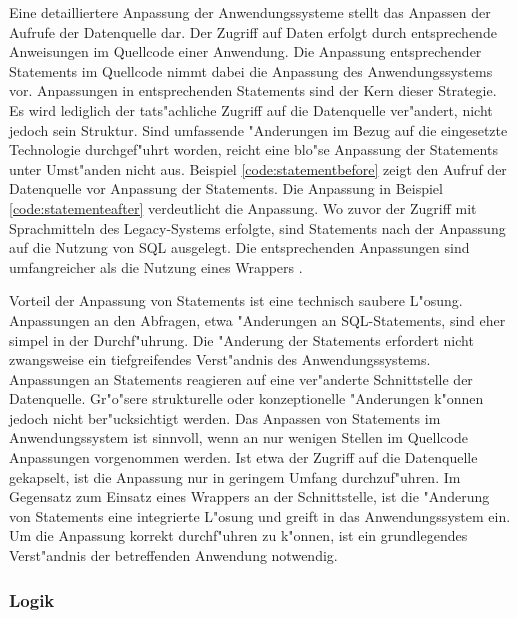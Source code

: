 Eine detailliertere Anpassung der Anwendungssysteme stellt das Anpassen der Aufrufe der Datenquelle dar. Der Zugriff auf Daten erfolgt durch entsprechende Anweisungen im Quellcode einer Anwendung. Die Anpassung entsprechender Statements im Quellcode nimmt dabei die Anpassung des Anwendungssystems vor. Anpassungen in entsprechenden Statements sind der Kern dieser Strategie. Es wird lediglich der tats"achliche Zugriff auf die Datenquelle ver"andert, nicht jedoch sein Struktur. Sind umfassende "Anderungen im Bezug auf die eingesetzte Technologie durchgef"uhrt worden, reicht eine blo"se Anpassung der Statements unter Umst"anden nicht aus.
\lb
Beispiel \ref{code:statementbefore} zeigt den Aufruf der Datenquelle vor Anpassung der Statements. Die Anpassung in Beispiel \ref{code:statementeafter} verdeutlicht die Anpassung. Wo zuvor der Zugriff mit Sprachmitteln des Legacy-Systems erfolgte, sind Statements nach der Anpassung auf die Nutzung von SQL ausgelegt. Die entsprechenden Anpassungen sind umfangreicher als die Nutzung eines Wrappers \citep{henrard-2002}.





Vorteil der Anpassung von Statements ist eine technisch saubere L"osung. Anpassungen an den Abfragen, etwa "Anderungen an SQL-Statements, sind eher simpel in der Durchf"uhrung. Die "Anderung der Statements erfordert nicht zwangsweise ein tiefgreifendes Verst"andnis des Anwendungssystems. 
\lb
Anpassungen an Statements reagieren auf eine ver"anderte Schnittstelle der Datenquelle. Gr"o"sere strukturelle oder konzeptionelle "Anderungen k"onnen jedoch nicht ber"ucksichtigt werden.
\lb
Das Anpassen von Statements im Anwendungssystem ist sinnvoll, wenn an nur wenigen Stellen im Quellcode Anpassungen vorgenommen werden. Ist etwa der Zugriff auf die Datenquelle gekapselt, ist die Anpassung nur in geringem Umfang durchzuf"uhren. Im Gegensatz zum Einsatz eines Wrappers an der Schnittstelle, ist die "Anderung von Statements eine integrierte L"osung und greift in das Anwendungssystem ein. Um die Anpassung korrekt durchf"uhren zu k"onnen, ist ein grundlegendes Verst"andnis der betreffenden Anwendung notwendig.

\subsubsection{Logik}

